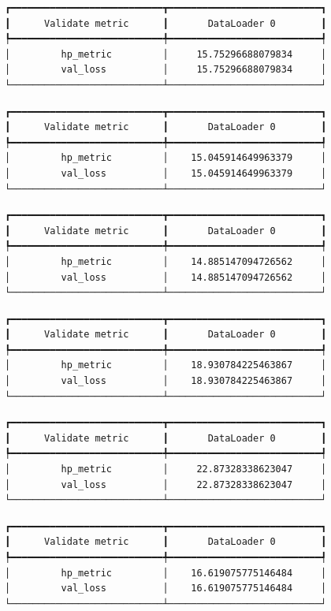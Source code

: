 \documentclass[
  letterpaper,
  DIV=11,
  numbers=noendperiod]{scrreprt}
\begin{document}
\begin{verbatim}
┏━━━━━━━━━━━━━━━━━━━━━━━━━━━┳━━━━━━━━━━━━━━━━━━━━━━━━━━━┓
┃      Validate metric      ┃       DataLoader 0        ┃
┡━━━━━━━━━━━━━━━━━━━━━━━━━━━╇━━━━━━━━━━━━━━━━━━━━━━━━━━━┩
│         hp_metric         │     15.75296688079834     │
│         val_loss          │     15.75296688079834     │
└───────────────────────────┴───────────────────────────┘
\end{verbatim}

\begin{verbatim}
┏━━━━━━━━━━━━━━━━━━━━━━━━━━━┳━━━━━━━━━━━━━━━━━━━━━━━━━━━┓
┃      Validate metric      ┃       DataLoader 0        ┃
┡━━━━━━━━━━━━━━━━━━━━━━━━━━━╇━━━━━━━━━━━━━━━━━━━━━━━━━━━┩
│         hp_metric         │    15.045914649963379     │
│         val_loss          │    15.045914649963379     │
└───────────────────────────┴───────────────────────────┘
\end{verbatim}

\begin{verbatim}
┏━━━━━━━━━━━━━━━━━━━━━━━━━━━┳━━━━━━━━━━━━━━━━━━━━━━━━━━━┓
┃      Validate metric      ┃       DataLoader 0        ┃
┡━━━━━━━━━━━━━━━━━━━━━━━━━━━╇━━━━━━━━━━━━━━━━━━━━━━━━━━━┩
│         hp_metric         │    14.885147094726562     │
│         val_loss          │    14.885147094726562     │
└───────────────────────────┴───────────────────────────┘
\end{verbatim}

\begin{verbatim}
┏━━━━━━━━━━━━━━━━━━━━━━━━━━━┳━━━━━━━━━━━━━━━━━━━━━━━━━━━┓
┃      Validate metric      ┃       DataLoader 0        ┃
┡━━━━━━━━━━━━━━━━━━━━━━━━━━━╇━━━━━━━━━━━━━━━━━━━━━━━━━━━┩
│         hp_metric         │    18.930784225463867     │
│         val_loss          │    18.930784225463867     │
└───────────────────────────┴───────────────────────────┘
\end{verbatim}

\begin{verbatim}
┏━━━━━━━━━━━━━━━━━━━━━━━━━━━┳━━━━━━━━━━━━━━━━━━━━━━━━━━━┓
┃      Validate metric      ┃       DataLoader 0        ┃
┡━━━━━━━━━━━━━━━━━━━━━━━━━━━╇━━━━━━━━━━━━━━━━━━━━━━━━━━━┩
│         hp_metric         │     22.87328338623047     │
│         val_loss          │     22.87328338623047     │
└───────────────────────────┴───────────────────────────┘
\end{verbatim}

\begin{verbatim}
┏━━━━━━━━━━━━━━━━━━━━━━━━━━━┳━━━━━━━━━━━━━━━━━━━━━━━━━━━┓
┃      Validate metric      ┃       DataLoader 0        ┃
┡━━━━━━━━━━━━━━━━━━━━━━━━━━━╇━━━━━━━━━━━━━━━━━━━━━━━━━━━┩
│         hp_metric         │    16.619075775146484     │
│         val_loss          │    16.619075775146484     │
└───────────────────────────┴───────────────────────────┘
\end{verbatim}
\end{document}
